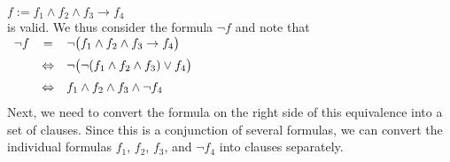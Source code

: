 \hspace*{1.3cm} 
$f := f_1 \wedge f_2 \wedge f_3 \rightarrow f_4$ 
\\[0.2cm]
is valid. We thus consider the formula $\neg f$ and note that \\[0.2cm]
\hspace*{1.3cm}
$
\begin{array}[t]{lcl}
  \neg f & =                & \neg\bigl(f_1 \wedge f_2 \wedge f_3       \rightarrow f_4 \bigr) \\[0.2cm]
         &  \Leftrightarrow & \neg\bigl(\neg(f_1 \wedge f_2 \wedge f_3) \vee        f_4 \bigr) \\[0.2cm]
         &  \Leftrightarrow & f_1 \wedge f_2 \wedge f_3 \wedge \neg f_4 \\[0.2cm]
\end{array}
$
\\[0.2cm]
Next, we need to convert the formula on the right side of this equivalence into a set of clauses.
Since this is a conjunction of several formulas, we can convert the individual formulas $f_1$, $f_2$, $f_3$,
and $\neg f_4$ into clauses separately. 
